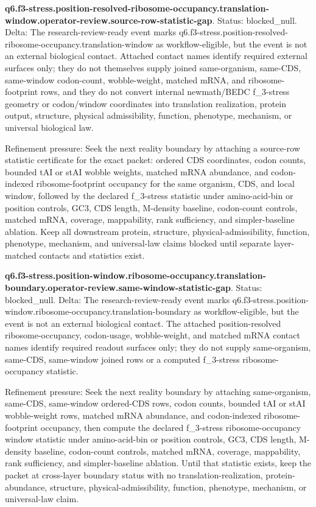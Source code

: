 \textbf{q6.f3-stress.position-resolved-ribosome-occupancy.translation-window.operator-review.source-row-statistic-gap}. Status: blocked\_null. Delta: The research-review-ready event marks q6.f3-stress.position-resolved-ribosome-occupancy.translation-window as workflow-eligible, but the event is not an external biological contact. Attached contact names identify required external surfaces only; they do not themselves supply joined same-organism, same-CDS, same-window codon-count, wobble-weight, matched mRNA, and ribosome-footprint rows, and they do not convert internal newmath/BEDC f\_3-stress geometry or codon/window coordinates into translation realization, protein output, structure, physical admissibility, function, phenotype, mechanism, or universal biological law.

Refinement pressure: Seek the next reality boundary by attaching a source-row statistic certificate for the exact packet: ordered CDS coordinates, codon counts, bounded tAI or stAI wobble weights, matched mRNA abundance, and codon-indexed ribosome-footprint occupancy for the same organism, CDS, and local window, followed by the declared f\_3-stress statistic under amino-acid-bin or position controls, GC3, CDS length, M-density baseline, codon-count controls, matched mRNA, coverage, mappability, rank sufficiency, and simpler-baseline ablation. Keep all downstream protein, structure, physical-admissibility, function, phenotype, mechanism, and universal-law claims blocked until separate layer-matched contacts and statistics exist.

\textbf{q6.f3-stress.position-window.ribosome-occupancy.translation-boundary.operator-review.same-window-statistic-gap}. Status: blocked\_null. Delta: The research-review-ready event marks q6.f3-stress.position-window.ribosome-occupancy.translation-boundary as workflow-eligible, but the event is not an external biological contact. The attached position-resolved ribosome-occupancy, codon-usage, wobble-weight, and matched mRNA contact names identify required readout surfaces only; they do not supply same-organism, same-CDS, same-window joined rows or a computed f\_3-stress ribosome-occupancy statistic.

Refinement pressure: Seek the next reality boundary by attaching same-organism, same-CDS, same-window ordered-CDS rows, codon counts, bounded tAI or stAI wobble-weight rows, matched mRNA abundance, and codon-indexed ribosome-footprint occupancy, then compute the declared f\_3-stress ribosome-occupancy window statistic under amino-acid-bin or position controls, GC3, CDS length, M-density baseline, codon-count controls, matched mRNA, coverage, mappability, rank sufficiency, and simpler-baseline ablation. Until that statistic exists, keep the packet at cross-layer boundary status with no translation-realization, protein-abundance, structure, physical-admissibility, function, phenotype, mechanism, or universal-law claim.

